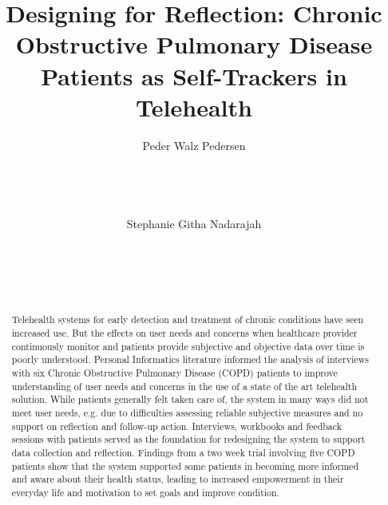 \documentclass{sigchi}
\begin{document}
\title{Designing for Reflection: Chronic Obstructive Pulmonary Disease Patients as Self-Trackers in Telehealth}

\author{
  \alignauthor Peder Walz Pedersen\\
\\
    \\
        \\
    \\
      \alignauthor Stephanie Githa Nadarajah\\
\\
    \\
        \\
    \\
}

\maketitle

\begin{abstract}
Telehealth systems for early detection and treatment of chronic conditions have seen increased use. But the effects on user needs and concerns when healthcare provider continuously monitor and patients provide subjective and objective data over time is poorly understood. Personal Informatics literature informed the analysis of interviews with six Chronic Obstructive Pulmonary Disease (COPD) patients to improve understanding of user needs and concerns in the use of a state of the art telehealth solution. While patients generally felt taken care of, the system in many ways did not meet user needs, e.g. due to difficulties assessing reliable subjective measures and no support on reflection and follow-up action. Interviews, workbooks and feedback sessions with patients served as the foundation for redesigning the system to support data collection and reflection. Findings from a two week trial involving five COPD patients show that the system supported some patients in becoming more informed and aware about their health status, leading to increased empowerment in their everyday life and motivation to set goals and improve condition.
\end{abstract}

\end{document}
